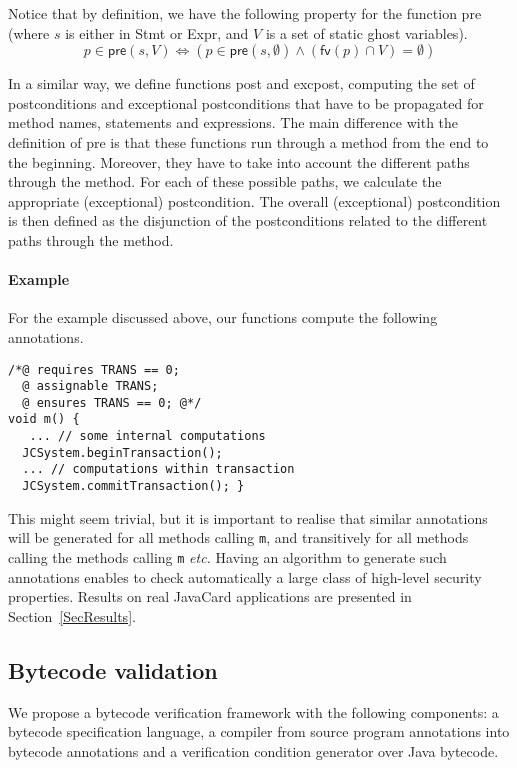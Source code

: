 Notice that by definition, we have the following property for the
function \textsf{pre} (where \(s\) is either in \textsf{Stmt} or
\textsf{Expr}, and \(V\) is a set of static ghost variables).
\[
p \in \textsf{pre}(s, V) \Leftrightarrow (p \in \textsf{pre}(s,
\emptyset) \wedge (\textsf{fv}(p) \cap V) = \emptyset)
\]

In a similar way, we define functions \textsf{post} and
\textsf{exc\-post},  computing the
set of postconditions and exceptional postconditions that have to be
propagated for method names, statements and expressions. The main
difference with the definition of \textsf{pre} is that these functions run
through a method from the end to the beginning. Moreover, they have to
take into account the different paths through the method. For
each of these possible paths, we calculate the appropriate
(exceptional) postcondition. The overall (exceptional) postcondition
is then defined as the disjunction of the postconditions related to
the different paths through the method. 

\paragraph{Example}
For the example discussed above, our functions compute the following
annotations.

\begin{verbatim}
/*@ requires TRANS == 0;
  @ assignable TRANS;
  @ ensures TRANS == 0; @*/
void m() { 
   ... // some internal computations
  JCSystem.beginTransaction();
  ... // computations within transaction
  JCSystem.commitTransaction(); }
\end{verbatim}
This might seem trivial, but it is important to realise that similar
annotations will be generated for all methods calling
\texttt{m}, and transitively for all methods calling the methods
calling \texttt{m} \emph{etc.}
Having an algorithm to generate such annotations enables to check
automatically a large class of high-level security properties.
Results on real JavaCard applications are presented in Section~\ref{SecResults}.

\subsection{Bytecode validation}\label{bytecodesection}
We propose a bytecode verification framework with the following components: a bytecode specification language, a compiler from source
 program annotations into bytecode annotations and a verification condition generator over Java bytecode.

